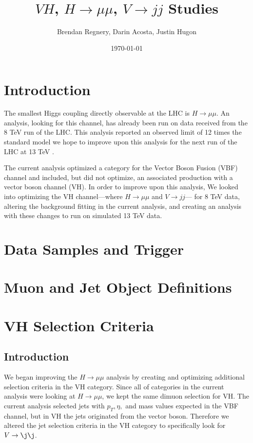 \documentclass[12pt]{article}
\title{$VH$, $H\rightarrow \mu \mu$, $V\rightarrow jj$ Studies}
\author{Brendan Regnery, Darin Acosta, Justin Hugon}
\date{\today}
\begin{document}
\maketitle
 
\section{Introduction}
The smallest Higgs coupling directly observable at the LHC is $H\rightarrow \mu \mu$. An analysis, looking for this channel, has already been run on data received from the 8 TeV run of the LHC. This analysis reported an observed limit of 12 times the standard model \cite{hmmPap} we hope to improve upon this analysis for the next run of the LHC at 13 TeV \cite{hmmAN}. 

The current analysis optimized a category for the Vector Boson Fusion (VBF) channel and included, but did not optimize, an associated production with a vector boson channel (VH). In order to improve upon this analysis, We looked into optimizing the VH channel---where $H\rightarrow \mu \mu$ and $V\rightarrow jj$--- for 8 TeV data, altering the background fitting in the current analysis, and creating an analysis with these changes to run on simulated 13 TeV data.
\section{Data Samples and Trigger}
\section{Muon and Jet Object Definitions}
\section{VH Selection Criteria}
\subsection{Introduction}
We began improving the $H \rightarrow \mu \mu$ analysis by creating and optimizing additional selection criteria in the VH category. Since all of categories in the current analysis were looking at $H \rightarrow \mu \mu$, we kept the same dimuon selection for VH. The current analysis selected jets with $p_{T}, \eta,$ and mass values expected in the VBF channel, but in VH the jets originated from the vector boson. Therefore we altered the jet selection criteria in the VH category to specifically look for $V \rightarrow \j \j$.
\end{document}
